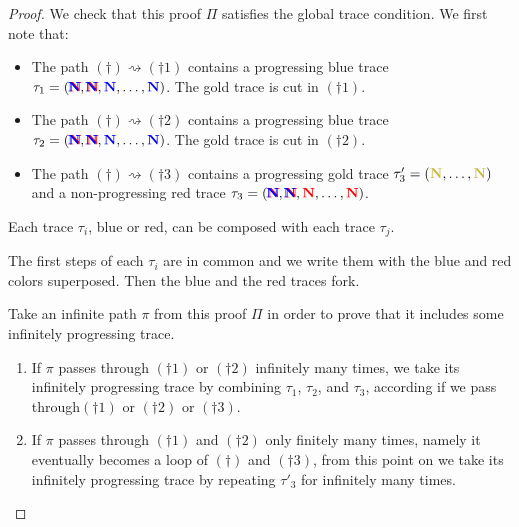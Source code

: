 \begin{proof}

\vspace{1cm}

We check that this proof $\Pi$ satisfies the global trace condition.
We first note that:

\begin{itemize}
\item
  The path $(\dagger)\rightsquigarrow(\dagger1)$ contains a progressing blue trace $\tau_1 = ({{\bf \color{red}{N}}\hspace{-1em}{\bf \color{blue}{N}}},{{\bf \color{red}{N}}\hspace{-1em}{\bf \color{blue}{N}}},{{\bf \color{blue}{N}}},\ldots,{{\bf \color{blue}{N}}})$. The gold trace is cut in $(\dagger1)$.
\item
  The path $(\dagger)\rightsquigarrow(\dagger2)$ contains a progressing blue trace $\tau_2 = ({{\bf \color{red}{N}}\hspace{-1em}{\bf \color{blue}{N}}},{{\bf \color{red}{N}}\hspace{-1em}{\bf \color{blue}{N}}},{{\bf \color{blue}{N}}},\ldots,{{\bf \color{blue}{N}}})$. The gold trace is cut in $(\dagger2)$.
\item
  The path $(\dagger)\rightsquigarrow(\dagger3)$ contains a progressing gold trace 
$\tau'_3 = (\goldN,\ldots,\goldN)$ and a non-progressing red trace 
$\tau_3 = ({{\bf \color{red}{N}}\hspace{-1em}{\bf \color{blue}{N}}},{{\bf \color{red}{N}}\hspace{-1em}{\bf \color{blue}{N}}},{{\bf \color{red}{N}}},\ldots,{{\bf \color{red}{N}}})$. 
\end{itemize}

Each trace $\tau_i$, blue or red, can be composed with each trace $\tau_j$. 

The first steps of each $\tau_i$ are in common and we write them with the blue and red colors superposed.
Then the blue and the red traces fork.

Take an infinite path $\pi$ from this proof $\Pi$ 
in order to prove that it includes some infinitely progressing trace.

\begin{enumerate}
\item
If $\pi$ passes through $(\dagger1)$ or $(\dagger2)$ infinitely many times,
we take its infinitely progressing trace by combining $\tau_1$, $\tau_2$, and $\tau_3$,
according if we pass through$(\dagger1)$ or $(\dagger2)$ or $(\dagger3)$. 

\item
If $\pi$ passes through $(\dagger1)$ and $(\dagger2)$ only finitely many times,
namely it eventually becomes a loop of $(\dagger)$ and $(\dagger3)$,
from this point on we take its infinitely progressing trace by repeating $\tau'_3$ for infinitely many times.
\end{enumerate}

\end{proof}



  
%
%
%
